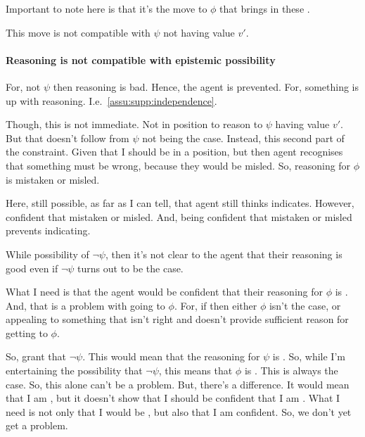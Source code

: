 \begin{note}
  Important to note here is that it's the move to \(\phi\) that brings in these \requ{}.

  This move is not compatible with \(\psi\) not having value \(v'\).
\end{note}

\paragraph{Reasoning is not compatible with epistemic possibility}

\begin{note}
  For, not \(\psi\) then reasoning is bad.
  Hence, the agent is prevented.
  For, something is up with reasoning.
  I.e.\ \autoref{assu:supp:independence}.

  Though, this is not immediate.
  Not in position to reason to \(\psi\) having value \(v'\).
  But that doesn't follow from \(\psi\) not being the case.
  Instead, this second part of the constraint.
  Given that I should be in a position, but then agent recognises that something must be wrong, because they would be misled.
  So, reasoning for \(\phi\) is mistaken or misled.

  Here, still possible, as far as I can tell, that agent still thinks indicates.
  However, confident that mistaken or misled.
  And, being confident that mistaken or misled prevents indicating.

  While possibility of \(\lnot\psi\), then it's not clear to the agent that their reasoning is good even if \(\lnot\psi\) turns out to be the case.

  What I need is that the agent would be confident that their reasoning for \(\phi\) is \mom{}.
  And, that is a problem with going to \(\phi\).
  For, if \mom{} then either \(\phi\) isn't the case, or appealing to something that isn't right and doesn't provide sufficient reason for getting to \(\phi\).

  So, grant that \(\lnot\psi\).
  This would mean that the reasoning for \(\psi\) is \mom{}.
  So, while I'm entertaining the possibility that \(\lnot\psi\), this means that \(\phi\) is \misled{}.
  This is always the case.
  So, this alone can't be a problem.
  But, there's a difference.
  It would mean that I am \misled{}, but it doesn't show that I should be confident that I am \misled{}.
  What I need is not only that I would be \misled{}, but also that I am confident.
  So, we don't yet get a problem.


\end{note}
